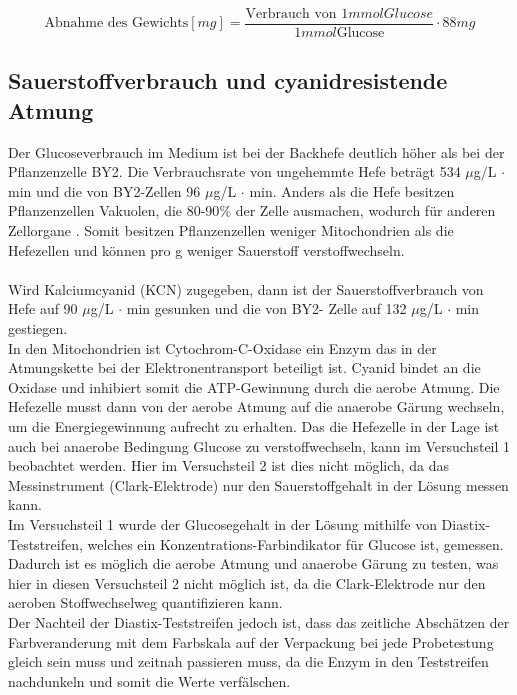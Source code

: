 \documentclass[10pt,a4paper]{article}
\begin{document}
	\begin{equation}\label{eq:Verbrauch}
			\text{Abnahme des Gewichts}  [mg] = \frac{\text{Verbrauch von } 1 mmol Glucose}{1 mmol \text{Glucose}} \cdot 88mg
	\end{equation}

		
	\subsection{Sauerstoffverbrauch und cyanidresistende Atmung}
	Der Glucoseverbrauch im Medium ist bei der Backhefe deutlich höher als bei der Pflanzenzelle BY2. Die Verbrauchsrate von ungehemmte Hefe beträgt 534 $\mu$g/L $\cdot$ min und die von BY2-Zellen 96 $\mu$g/L $\cdot$ min. Anders als die Hefe besitzen Pflanzenzellen Vakuolen, die 80-90$\%$ der Zelle ausmachen, wodurch für anderen Zellorgane . Somit besitzen Pflanzenzellen weniger Mitochondrien als die Hefezellen und können pro g weniger Sauerstoff verstoffwechseln.\\
	\\
	Wird Kalciumcyanid (KCN) zugegeben, dann ist der Sauerstoffverbrauch von Hefe auf 90 $\mu$g/L $\cdot$ min gesunken und die von BY2- Zelle auf 132 $\mu$g/L $\cdot$ min gestiegen.\\
	In den Mitochondrien ist Cytochrom-C-Oxidase ein Enzym das in der Atmungskette bei der Elektronentransport beteiligt ist. Cyanid bindet an die Oxidase und inhibiert somit die ATP-Gewinnung durch die aerobe Atmung.
	Die Hefezelle musst dann von der aerobe Atmung auf die anaerobe Gärung wechseln, um die Energiegewinnung aufrecht zu erhalten. Das die Hefezelle in der Lage ist auch bei anaerobe Bedingung Glucose zu verstoffwechseln, kann im Versuchsteil 1 beobachtet werden. Hier im Versuchsteil 2 ist dies nicht möglich, da das Messinstrument (Clark-Elektrode) nur den Sauerstoffgehalt in der Lösung messen kann.\\
	Im Versuchsteil 1 wurde der Glucosegehalt in der Lösung mithilfe von Diastix-Teststreifen, welches ein Konzentrations-Farbindikator für Glucose ist, gemessen. Dadurch ist es möglich die aerobe Atmung und anaerobe Gärung zu testen, was hier in diesen Versuchsteil 2 nicht möglich ist, da die Clark-Elektrode nur den aeroben Stoffwechselweg quantifizieren kann.\\
	Der Nachteil der Diastix-Teststreifen jedoch ist, dass das zeitliche Abschätzen der Farbveranderung mit dem Farbskala auf der Verpackung bei jede Probetestung gleich sein muss und zeitnah passieren muss, da die Enzym in den Teststreifen nachdunkeln und somit die Werte verfälschen.\\
\end{document}
